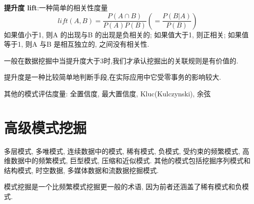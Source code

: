 \documentclass{article}
\begin{document}
\textbf{提升度 lift}:一种简单的相关性度量
$$
lift(A,B) = \frac{P(A \cap B)}{P(A)P(B)} ( = \frac{P(B|A)}{P(B)})
$$
如果值小于1, 则A 的出现与B 的出现是负相关的; 如果值大于1, 则正相关; 如果值等于1, 则A 与B 是相互独立的, 之间没有相关性.

一般在数据挖掘中当提升度大于3时,我们才承认挖掘出的关联规则是有价值的.

提升度是一种比较简单地判断手段,在实际应用中它受零事务的影响较大.

\bigskip
其他的模式评估度量: 全置信度, 最大置信度, Kluc(Kulczynski), 余弦

\section{高级模式挖掘}
多层模式, 多唯模式, 连续数据中的模式, 稀有模式, 负模式, 受约束的频繁模式, 高维数据中的频繁模式, 巨型模式, 压缩和近似模式.
其他的模式包括挖掘序列模式和结构模式, 时空数据, 多媒体数据和流数据挖掘模式.

模式挖掘是一个比频繁模式挖掘更一般的术语, 因为前者还涵盖了稀有模式和负模式.
\end{document}
